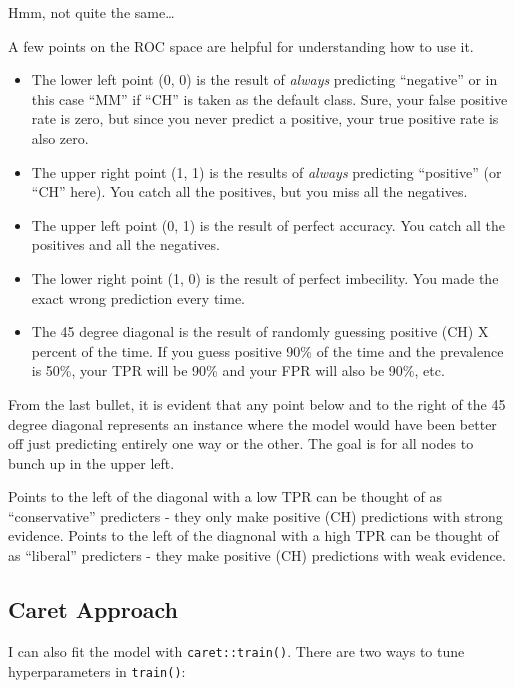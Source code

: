 \documentclass[
]{book}
\providecommand{\tightlist}{%
  \setlength{\itemsep}{0pt}\setlength{\parskip}{0pt}}
\begin{document}
Hmm, not quite the same\ldots{}

A few points on the ROC space are helpful for understanding how to use it.

\begin{itemize}
\tightlist
\item
  The lower left point (0, 0) is the result of \emph{always} predicting ``negative'' or in this case ``MM'' if ``CH'' is taken as the default class. Sure, your false positive rate is zero, but since you never predict a positive, your true positive rate is also zero.\\
\item
  The upper right point (1, 1) is the results of \emph{always} predicting ``positive'' (or ``CH'' here). You catch all the positives, but you miss all the negatives.
\item
  The upper left point (0, 1) is the result of perfect accuracy. You catch all the positives and all the negatives.
\item
  The lower right point (1, 0) is the result of perfect imbecility. You made the exact wrong prediction every time.
\item
  The 45 degree diagonal is the result of randomly guessing positive (CH) X percent of the time. If you guess positive 90\% of the time and the prevalence is 50\%, your TPR will be 90\% and your FPR will also be 90\%, etc.
\end{itemize}

From the last bullet, it is evident that any point below and to the right of the 45 degree diagonal represents an instance where the model would have been better off just predicting entirely one way or the other. The goal is for all nodes to bunch up in the upper left.

Points to the left of the diagonal with a low TPR can be thought of as ``conservative'' predicters - they only make positive (CH) predictions with strong evidence. Points to the left of the diagnonal with a high TPR can be thought of as ``liberal'' predicters - they make positive (CH) predictions with weak evidence.

\hypertarget{caret-approach}{%
\subsection{Caret Approach}\label{caret-approach}}

I can also fit the model with \texttt{caret::train()}. There are two ways to tune hyperparameters in \texttt{train()}:
\end{document}
